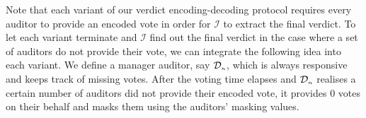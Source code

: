 Note that each variant of our verdict encoding-decoding protocol requires every auditor to provide an encoded vote  in order for $\mathcal{I}$ to extract the final verdict. To let each variant terminate and $\mathcal{I}$ find out the final verdict in the case where a  set of auditors do not provide their vote, we can integrate the    following idea into each variant. We define a manager auditor, say $\mathcal{D}_{\scriptscriptstyle n}$, which is always responsive and keeps track of missing votes. After the voting time elapses and $\mathcal{D}_{\scriptscriptstyle n}$ realises a certain number of auditors did not provide their encoded vote, it provides $0$ votes on their behalf and masks them using the auditors' masking values. 









